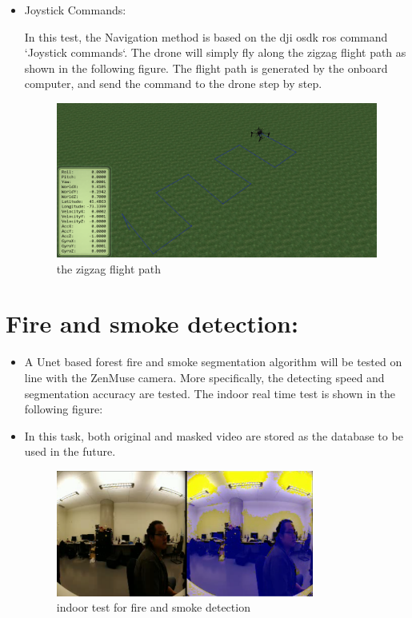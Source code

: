 \documentclass{report}
\begin{document}
\begin{itemize}
    \item Joystick Commands:

        In this test, the Navigation method is based on the dji osdk ros command 
        `Joystick commands`. The drone will simply fly along the zigzag flight
        path as shown in the following figure. The flight path is generated by
        the onboard computer, and send the command to the drone step by step.
        \begin{figure}[H]
            \centering
            \includegraphics[width=1\textwidth]{./img/nav}
            \caption{the zigzag flight path}
        \end{figure}
\end{itemize}


\section{Fire and smoke detection:}
\begin{itemize}
    \item A Unet based forest fire and smoke segmentation algorithm will be
        tested on line with the ZenMuse camera. More specifically, the detecting
        speed and segmentation accuracy are tested. The indoor real time test is
        shown in the following figure:

    \item In this task, both original and masked video are stored as the database
        to be used in the future.
        \begin{figure}[H]
            \centering
            \includegraphics[width=0.8\textwidth]{./img/Screenshot from 2021-10-02 17-33-33.png}
            \caption{indoor test for fire and smoke detection}
        \end{figure}

\end{itemize}
\end{document}

